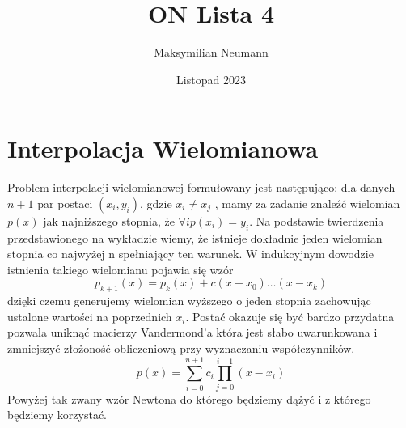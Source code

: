 \documentclass[10pt]{article}
\title{ON Lista 4}
\author{Maksymilian Neumann}
\date{Listopad 2023}
\begin{document}
\maketitle

\section{Interpolacja Wielomianowa}
Problem interpolacji wielomianowej formułowany jest następująco: dla danych $n + 1$ par postaci $(x_i, y_i)$, gdzie $x_i \neq x_j$ , mamy za zadanie znaleźć wielomian $p(x)$ jak najniższego stopnia, że $\forall i p(x_i) = y_i$. Na podstawie twierdzenia przedstawionego na wykładzie wiemy, że istnieje dokładnie jeden wielomian stopnia co najwyżej n spełniający ten warunek. W indukcyjnym dowodzie istnienia takiego wielomianu pojawia się wzór
\[p_{k+1}(x) = p_k(x) + c(x - x_0)\dots(x - x_k)\]
dzięki czemu generujemy wielomian wyższego o jeden stopnia zachowując ustalone wartości na poprzednich $x_i$. Postać okazuje się być bardzo przydatna pozwala uniknąć macierzy Vandermond'a która jest słabo uwarunkowana i zmniejszyć złożoność obliczeniową przy wyznaczaniu współczynników.
\[p(x) = \sum_{i=0}^{n+1} c_i \prod_{j=0}^{i-1} (x - x_i)\]
Powyżej tak zwany wzór Newtona do którego będziemy dążyć i z którego będziemy korzystać.
\end{document}
